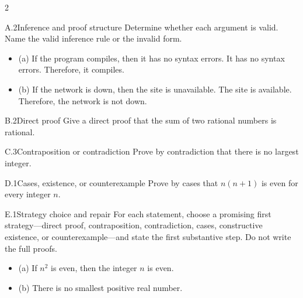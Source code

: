 \documentclass[9pt]{extarticle}
\begin{document}
\begin{multicols}{2}
\begin{CoreProblem}{A.2}{Inference and proof structure}
Determine whether each argument is valid. Name the valid inference rule or the invalid form.
\begin{itemize}
  \item (a) If the program compiles, then it has no syntax errors. It has no syntax errors. Therefore, it compiles.
  \item (b) If the network is down, then the site is unavailable. The site is
        available. Therefore, the network is not down.
\end{itemize}
\end{CoreProblem}
\begin{CoreProblem}{B.2}{Direct proof}
Give a direct proof that the sum of two rational numbers is rational.
\end{CoreProblem}
\begin{CoreProblem}{C.3}{Contraposition or contradiction}
Prove by contradiction that there is no largest integer.
\end{CoreProblem}
\columnbreak
\begin{CoreProblem}{D.1}{Cases, existence, or counterexample}
Prove by cases that $n(n+1)$ is even for every integer $n$.
\end{CoreProblem}
\begin{CoreProblem}{E.1}{Strategy choice and repair}
For each statement, choose a promising first strategy---direct proof,
contraposition, contradiction, cases, constructive existence, or
counterexample---and state the first substantive step. Do not write the full
proofs.
\begin{itemize}
  \item (a) If $n^2$ is even, then the integer $n$ is even.
  \item (b) There is no smallest positive real number.
\end{itemize}
\end{CoreProblem}
\end{multicols}
\CoreWorkArea
\FormBreak
{}
\end{document}

